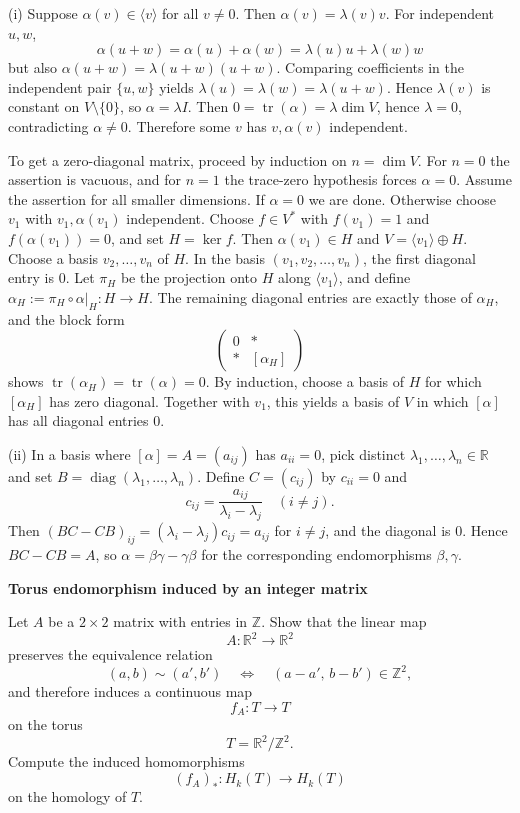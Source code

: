 \begin{solution}
(i) Suppose \(\alpha(v)\in \langle v\rangle\) for all \(v\neq0\). Then \(\alpha(v)=\lambda(v)v\).
For independent \(u,w\),
\[
\alpha(u+w)=\alpha(u)+\alpha(w)=\lambda(u)u+\lambda(w)w
\]
but also \(\alpha(u+w)=\lambda(u+w)(u+w)\). Comparing coefficients in the independent pair \(\{u,w\}\) yields
\(\lambda(u)=\lambda(w)=\lambda(u+w)\). Hence \(\lambda(v)\) is constant on \(V\setminus\{0\}\), so \(\alpha=\lambda I\).
Then \(0=\operatorname{tr}(\alpha)=\lambda\dim V\), hence \(\lambda=0\), contradicting \(\alpha\neq0\). Therefore some \(v\) has
\(v,\alpha(v)\) independent.

To get a zero-diagonal matrix, proceed by induction on \(n=\dim V\).
For \(n=0\) the assertion is vacuous, and for \(n=1\) the trace-zero hypothesis forces \(\alpha=0\).
Assume the assertion for all smaller dimensions. If \(\alpha=0\) we are done. Otherwise choose \(v_1\) with
\(v_1,\alpha(v_1)\) independent. Choose \(f\in V^*\) with \(f(v_1)=1\) and \(f(\alpha(v_1))=0\), and set \(H=\ker f\).
Then \(\alpha(v_1)\in H\) and \(V=\langle v_1\rangle\oplus H\). Choose a basis \(v_2,\dots,v_n\) of \(H\).
In the basis \((v_1,v_2,\dots,v_n)\), the first diagonal entry is \(0\). Let \(\pi_H\) be the projection onto \(H\) along \(\langle v_1\rangle\),
and define \(\alpha_H:=\pi_H\circ \alpha|_H:H\to H\). The remaining diagonal entries are exactly those of \(\alpha_H\), and the block form
\[
\begin{pmatrix}
	0 & *\\
	* & [\alpha_H]
\end{pmatrix}
\]
shows \(\operatorname{tr}(\alpha_H)=\operatorname{tr}(\alpha)=0\). By induction, choose a basis of \(H\) for which \([\alpha_H]\) has zero diagonal.
Together with \(v_1\), this yields a basis of \(V\) in which \([\alpha]\) has all diagonal entries \(0\).

(ii) In a basis where \([\alpha]=A=(a_{ij})\) has \(a_{ii}=0\), pick distinct \(\lambda_1,\dots,\lambda_n\in\mathbb R\) and set
\(B=\operatorname{diag}(\lambda_1,\dots,\lambda_n)\). Define \(C=(c_{ij})\) by \(c_{ii}=0\) and
\[
c_{ij}=\frac{a_{ij}}{\lambda_i-\lambda_j}\quad (i\neq j).
\]
Then \((BC-CB)_{ij}=(\lambda_i-\lambda_j)c_{ij}=a_{ij}\) for \(i\neq j\), and the diagonal is \(0\). Hence \(BC-CB=A\),
so \(\alpha=\beta\gamma-\gamma\beta\) for the corresponding endomorphisms \(\beta,\gamma\).
\end{solution}

\begin{problem}[CP-I-0004]
\label{prob:cp-i-0004}
\textbf{Torus endomorphism induced by an integer matrix}

\hspace*{1.5em}Let \(A\) be a \(2\times 2\) matrix with entries in \(\mathbb Z\). Show that the linear map
\[
A:\mathbb R^2\to \mathbb R^2
\]
preserves the equivalence relation
\[
(a,b)\sim (a',b')
\quad\Longleftrightarrow\quad
(a-a',\,b-b')\in \mathbb Z^2,
\]
and therefore induces a continuous map
\[
f_A:T\to T
\]
on the torus
\[
T=\mathbb R^2/\mathbb Z^2.
\]
Compute the induced homomorphisms
\[
(f_A)_*:H_k(T)\to H_k(T)
\]
on the homology of \(T\).
\end{problem}

